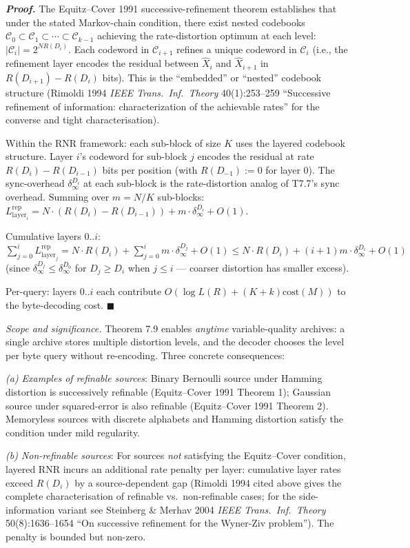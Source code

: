 \documentclass[
]{article}
\begin{document}
\emph{\textbf{Proof.}} The Equitz--Cover 1991 successive-refinement
theorem establishes that under the stated Markov-chain condition,
there exist nested codebooks $\mathcal{C}_0 \subset \mathcal{C}_1
\subset \cdots \subset \mathcal{C}_{k-1}$ achieving the
rate-distortion optimum at each level: $|\mathcal{C}_i| = 2^{N R(D_i)}$.
Each codeword in $\mathcal{C}_{i+1}$ refines a unique codeword in
$\mathcal{C}_i$ (i.e., the refinement layer encodes the residual
between $\hat{X}_i$ and $\hat{X}_{i+1}$ in $R(D_{i+1}) - R(D_i)$ bits).
This is the ``embedded'' or ``nested'' codebook structure
(Rimoldi 1994 \emph{IEEE Trans.\ Inf.\ Theory} 40(1):253--259
``Successive refinement of information: characterization of the
achievable rates'' for the converse and tight characterisation).

Within the RNR framework: each sub-block of size $K$ uses the layered
codebook structure. Layer $i$'s codeword for sub-block $j$ encodes
the residual at rate $R(D_i) - R(D_{i-1})$ bits per position (with
$R(D_{-1}) := 0$ for layer 0). The sync-overhead $\delta_\infty^{D_i}$
at each sub-block is the rate-distortion analog of T7.7's
sync overhead. Summing over $m = N/K$ sub-blocks:
$L^{\mathrm{rep}}_{\mathrm{layer}_i} = N \cdot (R(D_i) - R(D_{i-1})) +
m \cdot \delta_\infty^{D_i} + O(1)$.

Cumulative layers $0..i$:
$\sum_{j=0}^{i} L^{\mathrm{rep}}_{\mathrm{layer}_j} = N \cdot R(D_i) +
\sum_{j=0}^{i} m \cdot \delta_\infty^{D_j} + O(1) \leq N \cdot R(D_i) +
(i+1) m \cdot \delta_\infty^{D_i} + O(1)$ (since
$\delta_\infty^{D_j} \leq \delta_\infty^{D_0}$ for $D_j \geq D_i$ when
$j \leq i$ --- coarser distortion has smaller excess).

Per-query: layers $0..i$ each contribute $O(\log L(R) + (K+k)
\mathrm{cost}(M))$ to the byte-decoding cost.
\hfill$\blacksquare$

\emph{Scope and significance.} Theorem 7.9 enables \emph{anytime}
variable-quality archives: a single archive stores multiple distortion
levels, and the decoder chooses the level per byte query without
re-encoding. Three concrete consequences:

\emph{(a) Examples of refinable sources}: Binary Bernoulli source
under Hamming distortion is successively refinable (Equitz--Cover 1991
Theorem 1); Gaussian source under squared-error is also refinable
(Equitz--Cover 1991 Theorem 2). Memoryless sources with discrete
alphabets and Hamming distortion satisfy the condition under mild
regularity.

\emph{(b) Non-refinable sources}: For sources \emph{not} satisfying
the Equitz--Cover condition, layered RNR incurs an additional rate
penalty per layer: cumulative layer rates exceed $R(D_i)$ by a
source-dependent gap (Rimoldi 1994 cited above gives the complete
characterisation of refinable vs.\ non-refinable cases; for the side-
information variant see Steinberg \& Merhav 2004
\emph{IEEE Trans.\ Inf.\ Theory} 50(8):1636--1654 ``On successive
refinement for the Wyner-Ziv problem''). The penalty is bounded but
non-zero.
\end{document}
